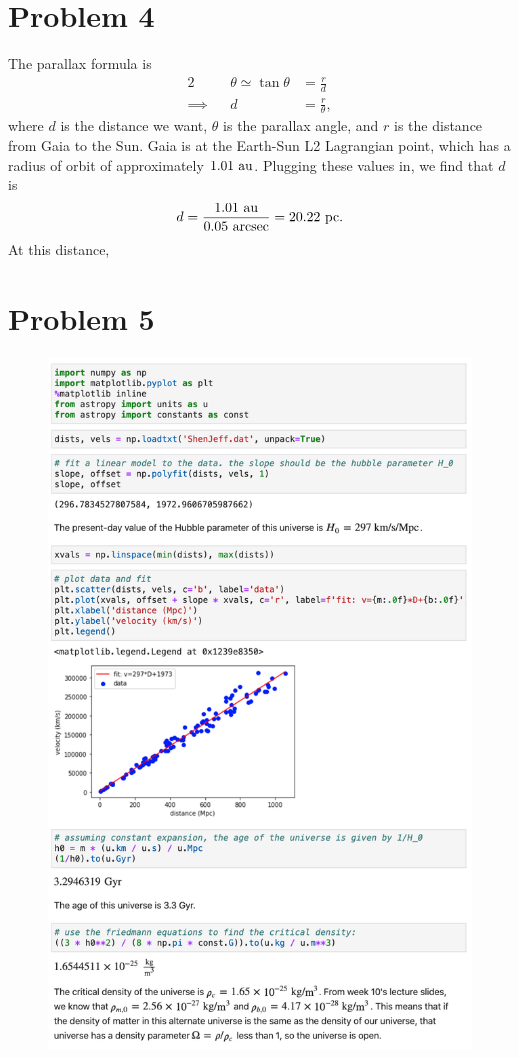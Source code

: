 \documentclass[11pt,letterpaper]{article}
\begin{document}
\section*{Problem 4}

The parallax formula is 
\begin{alignat*}{2}
    &&\theta \simeq \tan{\theta} &= \frac{r}{d} \\
    \implies&& d &= \frac{r}{\theta},
\end{alignat*}
where $d$ is the distance we want, $\theta$ is the parallax angle, and $r$ is the distance from Gaia to the Sun. Gaia is at the Earth-Sun L2 Lagrangian point, which has a radius of orbit of approximately $1.01~{\rm au}$. Plugging these values in, we find that $d$ is 
\begin{align*}
    d = \frac{1.01~{\rm au}}{0.05~{\rm arcsec}} = 20.22~{\rm pc}.
\end{align*}
At this distance, 

\newpage

\section*{Problem 5}

\begin{figure}[!htbp]
    \centering
    \includegraphics[width=0.78\linewidth]{q5.png}
\end{figure}
\end{document}
